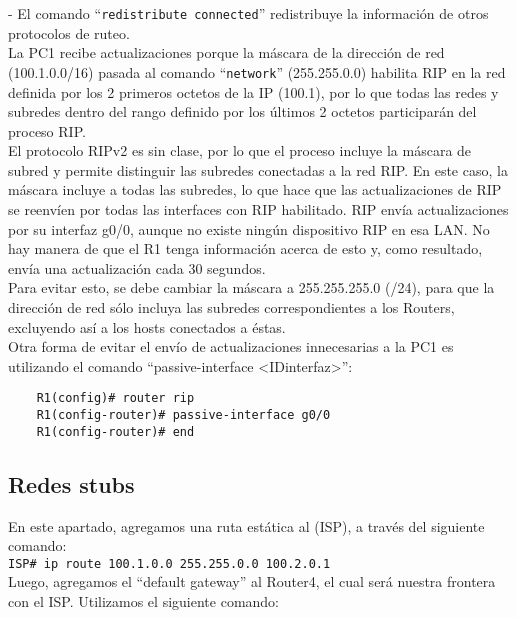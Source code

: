 \documentclass{article}
\begin{document}
- El comando ``\texttt{redistribute connected}'' redistribuye la informaci\'on de otros protocolos de ruteo. \\

La PC1 recibe actualizaciones porque la m\'ascara de la direcci\'on de red (100.1.0.0/16) pasada al comando ``\texttt{network}'' (255.255.0.0) habilita RIP en la red definida por los 2 primeros octetos de la IP (100.1), por lo que todas las redes y subredes dentro del rango definido por los \'ultimos 2 octetos participar\'an del proceso RIP. \\

El protocolo RIPv2 es sin clase, por lo que el proceso incluye la m\'ascara de subred y permite distinguir las subredes conectadas a la red RIP. En este caso, la m\'ascara incluye a todas las subredes, lo que hace que las actualizaciones de RIP se reenvíen por todas las interfaces con RIP habilitado. RIP envía actualizaciones por su interfaz g0/0, aunque no existe ningún dispositivo RIP en esa LAN. No hay manera de que el R1 tenga información acerca de esto y, como resultado, envía una actualización cada 30 segundos. \\

Para evitar esto, se debe cambiar la m\'ascara a 255.255.255.0 (/24), para que la direcci\'on de red s\'olo incluya las subredes correspondientes a los Routers, excluyendo as\'i a los hosts conectados a \'estas. \\

Otra forma de evitar el envío de actualizaciones innecesarias a la PC1 es utilizando el comando ``passive-interface <IDinterfaz>'':

\begin{verbatim}
    R1(config)# router rip 
    R1(config-router)# passive-interface g0/0
    R1(config-router)# end
\end{verbatim}

\subsection{Redes stubs}

En este apartado, agregamos una ruta est\'atica al (ISP), a trav\'es del siguiente comando: \\

\texttt{ISP\# ip route 100.1.0.0 255.255.0.0 100.2.0.1} \\

Luego, agregamos el ``default gateway'' al Router4, el cual ser\'a nuestra frontera con el ISP. Utilizamos el siguiente comando: \\
\end{document}
